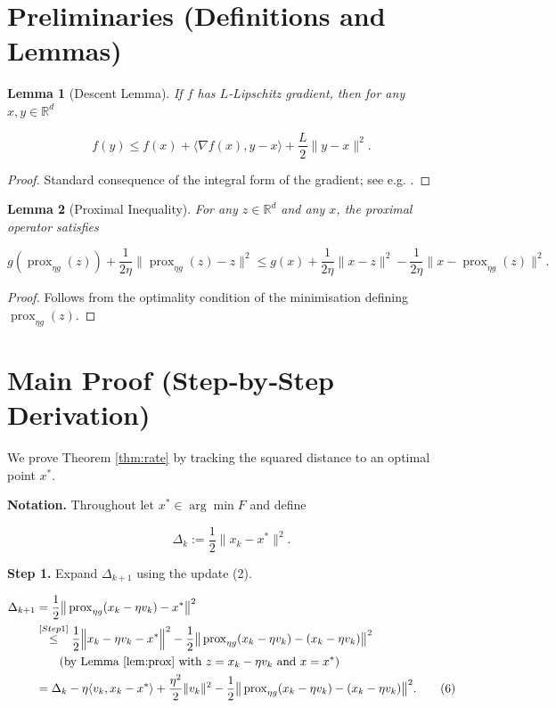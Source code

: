 \documentclass{article}
\newtheorem{lemma}{Lemma}
\newcommand{\prox}{\operatorname{prox}}
\newcommand{\R}{\mathbb{R}}
\begin{document}
\section*{Preliminaries (Definitions and Lemmas)}
\begin{lemma}[Descent Lemma]\label{lem:descent}
If $f$ has $L$‑Lipschitz gradient, then for any $x,y\in\R^{d}$  

\[
f(y)\le f(x)+\langle\nabla f(x),y-x\rangle+\frac{L}{2}\|y-x\|^{2}.
\tag{4}
\]
\end{lemma}
\begin{proof}
Standard consequence of the integral form of the gradient; see e.g. \cite{Nesterov2004}.
\end{proof}

\begin{lemma}[Proximal Inequality]\label{lem:prox}
For any $z\in\R^{d}$ and any $x$, the proximal operator satisfies  

\[
g(\prox_{\eta g}(z))+\frac{1}{2\eta}\bigl\|\prox_{\eta g}(z)-z\bigr\|^{2}
\le g(x)+\frac{1}{2\eta}\|x-z\|^{2}
-\frac{1}{2\eta}\bigl\|x-\prox_{\eta g}(z)\bigr\|^{2}.
\tag{5}
\]
\end{lemma}
\begin{proof}
Follows from the optimality condition of the minimisation defining $\prox_{\eta g}(z)$.
\end{proof}

\section*{Main Proof (Step‑by‑Step Derivation)}
We prove Theorem \ref{thm:rate} by tracking the squared distance to an optimal point $x^{*}$.

\noindent\textbf{Notation.} Throughout let $x^{*}\in\arg\min F$ and define  

\[
\Delta_{k}:=\frac{1}{2}\|x_{k}-x^{*}\|^{2}.
\]

\noindent\textbf{Step 1.} Expand $\Delta_{k+1}$ using the update (2).  

\[
\begin{aligned}
\Delta_{k+1}
&=\frac12\bigl\|\,\prox_{\eta g}(x_{k}-\eta v_{k})-x^{*}\bigr\|^{2}\\
&\overset{[Step 1]}{\le}
\frac12\Bigl\|x_{k}-\eta v_{k}-x^{*}\Bigr\|^{2}
       -\frac12\bigl\|\,\prox_{\eta g}(x_{k}-\eta v_{k})-(x_{k}-\eta v_{k})\bigr\|^{2}  \\
&\qquad\text{(by Lemma \ref{lem:prox} with $z=x_{k}-\eta v_{k}$ and $x=x^{*}$)}\\
&=\Delta_{k}-\eta\langle v_{k},x_{k}-x^{*}\rangle
   +\frac{\eta^{2}}{2}\|v_{k}\|^{2}
   -\frac12\bigl\|\,\prox_{\eta g}(x_{k}-\eta v_{k})-(x_{k}-\eta v_{k})\bigr\|^{2}.
\tag{6}
\end{aligned}
\]
\end{document}
